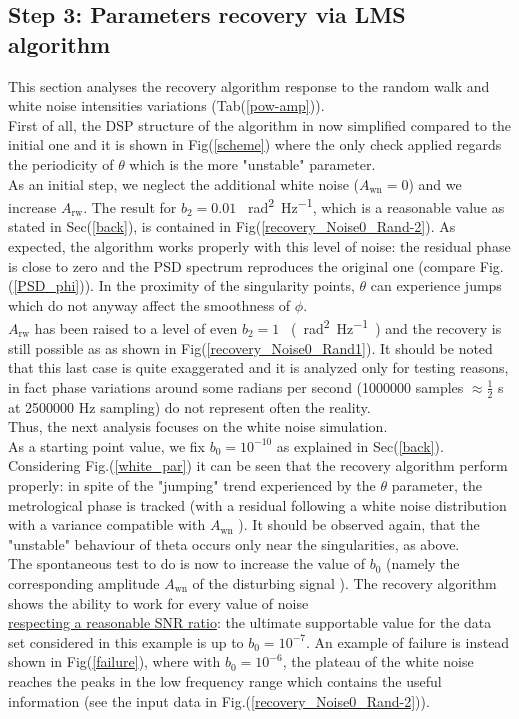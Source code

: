 \documentclass[ fontsize=11pt]{scrartcl} %
\numberwithin{equation}{section} %
\numberwithin{figure}{section} %
\numberwithin{table}{section} %
\begin{document}
\pagebreak
\subsection{Step 3: Parameters recovery via LMS algorithm}
This section analyses the recovery algorithm response to the random walk and white noise intensities variations (Tab(\ref{pow-amp})). \\

First of all, the DSP structure of the algorithm in now simplified compared to the initial one and it is shown in Fig(\ref{scheme}) where the only check applied regards the periodicity of $\theta$ which is the more "unstable" parameter.\\

As an initial step, we neglect the additional white noise ($A_{\text{wn}}=0$) and we increase $A_{\text{rw}}$. The result for  $b_2=0.01$ \SI{}{\radian\squared\per\hertz}, which is a reasonable value as stated in Sec({\ref{back}}), is contained in Fig(\ref{recovery_Noise0_Rand-2}). As expected, the algorithm works properly with this level of noise: the residual phase is close to zero and the PSD spectrum reproduces the original one (compare Fig.(\ref{PSD_phi})). In the proximity of the singularity points, $\theta$ can experience jumps  which do not anyway affect the smoothness of $\phi$.\\
$A_{\text{rw}}$ has been raised to a level of even $b_2=1$ \SI{}{(\radian\squared\per\hertz)} and the recovery is still possible as as shown in Fig(\ref{recovery_Noise0_Rand1}). It should be noted that this last case is quite exaggerated and it is analyzed only for testing reasons, in fact phase variations around some radians per second (1000000 samples $\approx \frac{1}{2}$  s at 2500000 Hz sampling) do not represent often the reality.
\\

Thus, the next analysis focuses on the white noise simulation.\\
As a starting point value, we fix $b_0=10^{-10}$ as explained in Sec({\ref{back}}). Considering Fig.(\ref{white_par}) it can be seen that the recovery algorithm perform properly: in spite of the "jumping" trend experienced by the $\theta$ parameter, the metrological phase is tracked (with a residual following a white noise distribution with a variance compatible with $A_{\text{wn}}$ ). It should be observed again, that the "unstable" behaviour of theta occurs only near the singularities, as above. \\
The spontaneous test to do is now to increase the value of $b_0$ (namely the corresponding amplitude $A_{\text{wn}}$ of the disturbing signal ).
The recovery algorithm shows the ability to work for every value of noise \\ \underline{respecting a reasonable SNR ratio}: the ultimate supportable value for the data set considered in this example is up to $b_0=10^{-7}$. An example of failure is instead shown in Fig(\ref{failure}), where with $b_0=10^{-6}$, the plateau of the white noise reaches the peaks in the low frequency range which contains the useful information (see the input data in Fig.(\ref{recovery_Noise0_Rand-2})).
\end{document}
